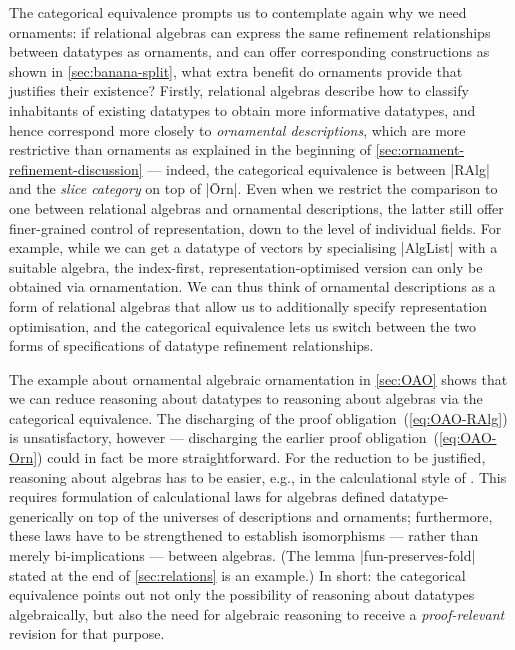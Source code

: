 The categorical equivalence prompts us to contemplate again why we need ornaments: if relational algebras can express the same refinement relationships between datatypes as ornaments, and can offer corresponding constructions as shown in \autoref{sec:banana-split}, what extra benefit do ornaments provide that justifies their existence?
Firstly, relational algebras describe how to classify inhabitants of existing datatypes to obtain more informative datatypes, and hence correspond more closely to \emph{ornamental descriptions}, which are more restrictive than ornaments as explained in the beginning of \autoref{sec:ornament-refinement-discussion} --- indeed, the categorical equivalence is between |RAlg| and the \emph{slice category} on top of |Ōrn|.
Even when we restrict the comparison to one between relational algebras and ornamental descriptions, the latter still offer finer-grained control of representation, down to the level of individual fields.
For example, while we can get a datatype of vectors by specialising |AlgList| with a suitable algebra, the index-first, representation-optimised version can only be obtained via ornamentation.
We can thus think of ornamental descriptions as a form of relational algebras that allow us to additionally specify representation optimisation, and the categorical equivalence lets us switch between the two forms of specifications of datatype refinement relationships.

The example about ornamental algebraic ornamentation in \autoref{sec:OAO} shows that we can reduce reasoning about datatypes to reasoning about algebras via the categorical equivalence.
The discharging of the proof obligation~(\ref{eq:OAO-RAlg}) is unsatisfactory, however --- discharging the earlier proof obligation~(\ref{eq:OAO-Orn}) could in fact be more straightforward.
For the reduction to be justified, reasoning about algebras has to be easier, e.g., in the calculational style of \citet{Bird-AoP}.
This requires formulation of calculational laws for algebras defined datatype-generically on top of the universes of descriptions and ornaments; furthermore, these laws have to be strengthened to establish isomorphisms --- rather than merely bi-implications --- between algebras.
(The lemma |fun-preserves-fold| stated at the end of \autoref{sec:relations} is an example.)
In short: the categorical equivalence points out not only the possibility of reasoning about datatypes algebraically, but also the need for algebraic reasoning to receive a \emph{proof-relevant} revision for that purpose.
